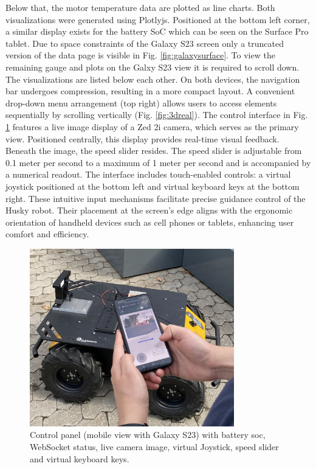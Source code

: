 \documentclass[conference]{IEEEtran}
\begin{document}
Below that, the motor temperature data are plotted as line charts. Both visualizations were generated using Plotlyjs.
Positioned at the bottom left corner, a similar display exists for the battery SoC which can be seen on the Surface Pro tablet. Due to space constraints of the Galaxy S23 screen only a truncated version of the data page is visible in Fig. \ref{fig:galaxysurface}. To view the remaining gauge and plots on the Galxy S23 view it is required to scroll down. The visualizations are listed below each other.  
On both devices, the navigation bar undergoes compression, resulting in a more compact layout.
A convenient drop-down menu arrangement (top right) allows users to access elements sequentially by scrolling vertically (Fig. \ref{fig:3dreal}).
The control interface in Fig. \ref{fig:galaxycontrol} features a live image display of a Zed 2i camera, which serves as the primary view. Positioned centrally, this display provides real-time visual feedback. Beneath the image, the speed slider resides. The speed slider is adjustable from 0.1 meter per second to a maximum of 1 meter per second and is accompanied by a numerical readout.
The interface includes touch-enabled controls: a virtual joystick positioned at the bottom left and virtual keyboard keys at the bottom right. These intuitive input mechanisms facilitate precise guidance control of the Husky robot. 
Their placement at the screen's edge aligns with the ergonomic orientation of handheld devices such as cell phones or tablets, enhancing user comfort and efficiency. 
\begin{figure}[htbp]
    \centerline{\includegraphics[width=8.9cm]{Pictures/galaxycontrol.jpg}}
    \caption{Control panel (mobile view with Galaxy S23) with battery soc, WebSocket status, live camera image, virtual Joystick, speed slider and virtual keyboard keys.}
    \label{fig:galaxycontrol}
\end{figure}
\end{document}
